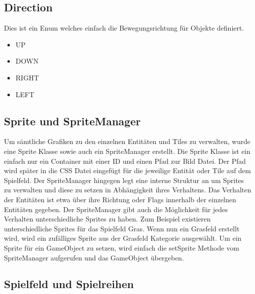 \documentclass[a4paper,10pt]{report}
\begin{document}
{		\subsection{Direction}
		{
			\label{ssec:direction}
			Dies ist ein Enum welches einfach die Bewegungsrichtung für Objekte definiert.
			
			\begin{itemize}
				\item UP
				\item DOWN
				\item RIGHT
				\item LEFT
			\end{itemize}
		}		
		
		
		\subsection{Sprite und SpriteManager}
		{
			\label{ssec:sprite}
			
			Um sämtliche Grafiken zu den einzelnen Entitäten und Tiles zu verwalten, wurde eine Sprite Klasse sowie auch ein SpriteManager erstellt.
			Die Sprite Klasse ist ein einfach nur ein Container mit einer ID und einen Pfad zur Bild Datei. Der Pfad wird später in die CSS Datei eingefügt für 
			die jeweilige Entität oder Tile auf dem Spielfeld.
			\newline \newline
			Der SpriteManager hingegen legt eine interne Struktur an um Sprites zu verwalten und diese zu setzen in Abhängigkeit ihres Verhaltens. Das Verhalten 
			der Entitäten ist etwa über ihre Richtung oder Flags innerhalb der einzelnen Entitäten gegeben. 
			\newline \newline
			Der SpriteManager gibt auch die Möglichkeit für jedes Verhalten unterschiedliche Sprites zu haben. 
			Zum Beispiel existieren unterschiedliche Sprites für das Spielfeld Gras. Wenn nun ein Grasfeld erstellt wird, wird ein zufälliges 
			Sprite aus der Grasfeld Kategorie ausgewählt.
			\newline \newline
			Um ein Sprite für ein GameObject zu setzen, wird einfach die setSprite Methode vom SpriteManager aufgerufen und das GameObject übergeben.	
		}	
		
		\subsection{Spielfeld und Spielreihen}
		{
			\label{ssec:field}
			
}}
\end{document}

